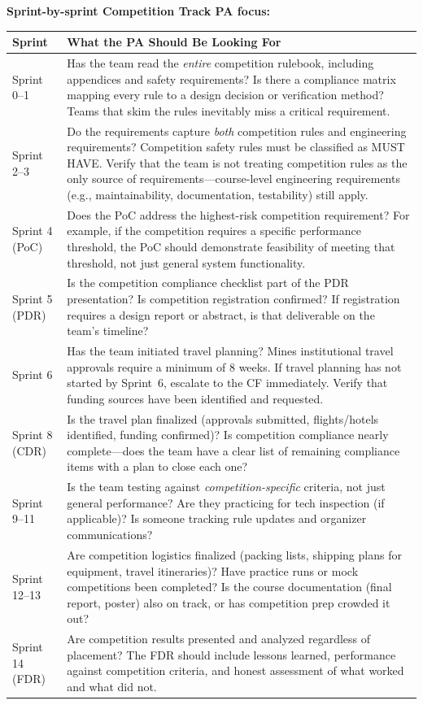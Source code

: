 \textbf{Sprint-by-sprint Competition Track PA focus:}

\begin{center}
\small
\begin{tabularx}{\textwidth}{>{\raggedright\arraybackslash}p{2.2cm} X}
\toprule
\textbf{Sprint} & \textbf{What the PA Should Be Looking For} \\
\midrule
Sprint 0--1 &
Has the team read the \emph{entire} competition rulebook, including appendices and safety requirements? Is there a compliance matrix mapping every rule to a design decision or verification method? Teams that skim the rules inevitably miss a critical requirement. \\
\midrule
Sprint 2--3 &
Do the requirements capture \emph{both} competition rules and engineering requirements? Competition safety rules must be classified as MUST HAVE. Verify that the team is not treating competition rules as the only source of requirements---course-level engineering requirements (e.g., maintainability, documentation, testability) still apply. \\
\midrule
Sprint 4 (PoC) &
Does the PoC address the highest-risk competition requirement? For example, if the competition requires a specific performance threshold, the PoC should demonstrate feasibility of meeting that threshold, not just general system functionality. \\
\midrule
Sprint 5 (PDR) &
Is the competition compliance checklist part of the PDR presentation? Is competition registration confirmed? If registration requires a design report or abstract, is that deliverable on the team's timeline? \\
\midrule
Sprint 6 &
Has the team initiated travel planning? Mines institutional travel approvals require a minimum of 8 weeks. If travel planning has not started by Sprint~6, escalate to the CF immediately. Verify that funding sources have been identified and requested. \\
\midrule
Sprint 8 (CDR) &
Is the travel plan finalized (approvals submitted, flights/hotels identified, funding confirmed)? Is competition compliance nearly complete---does the team have a clear list of remaining compliance items with a plan to close each one? \\
\midrule
Sprint 9--11 &
Is the team testing against \emph{competition-specific} criteria, not just general performance? Are they practicing for tech inspection (if applicable)? Is someone tracking rule updates and organizer communications? \\
\midrule
Sprint 12--13 &
Are competition logistics finalized (packing lists, shipping plans for equipment, travel itineraries)? Have practice runs or mock competitions been completed? Is the course documentation (final report, poster) also on track, or has competition prep crowded it out? \\
\midrule
Sprint 14 (FDR) &
Are competition results presented and analyzed regardless of placement? The FDR should include lessons learned, performance against competition criteria, and honest assessment of what worked and what did not. \\
\bottomrule
\end{tabularx}
\end{center}

